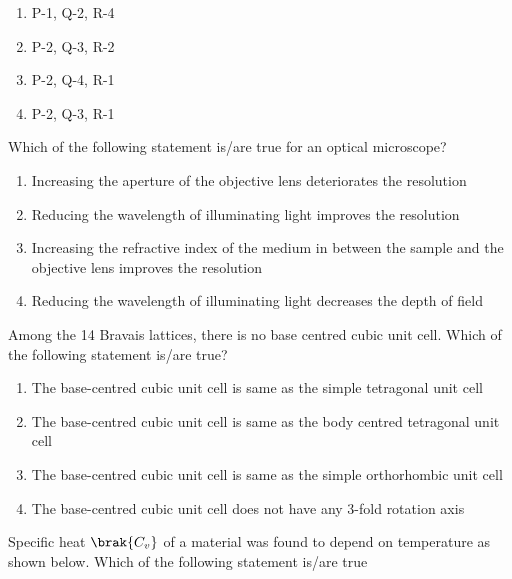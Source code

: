 		\hfill{}

		\begin{enumerate}
			\item P-1, Q-2, R-4
			\item P-2, Q-3, R-2
			\item P-2, Q-4, R-1
			\item P-2, Q-3, R-1
		\end{enumerate}

	\item Which of the following statement is/are true for an optical microscope?
		
		\hfill{}

		\begin{enumerate}
			\item Increasing the aperture of the objective lens deteriorates the resolution
			\item Reducing the wavelength of illuminating light improves the resolution
			\item Increasing the refractive index of the medium in between the sample and the objective lens improves the resolution
			\item Reducing the wavelength of illuminating light decreases the depth of field
		\end{enumerate}

	\item Among the 14 Bravais lattices, there is no base centred cubic unit cell. Which of the following statement is/are true?
		
		\hfill{}

		\begin{enumerate}
			\item The base-centred cubic unit cell is same as the simple tetragonal unit cell
			\item The base-centred cubic unit cell is same as the body centred tetragonal unit cell
			\item The base-centred cubic unit cell is same as the simple orthorhombic unit cell
			\item The base-centred cubic unit cell does not have any 3-fold rotation axis
		\end{enumerate}

	\item Specific heat $\brak{C_v}$ of a material was found to depend on temperature as shown below. Which of the following statement is/are true 

